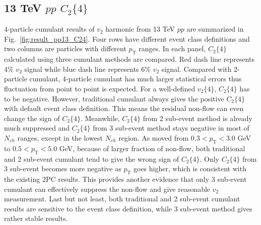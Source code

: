 \subsection{13 TeV $pp$ $C_{2}\{4\}$}
4-particle cumulant results of $v_{2}$ harmonic from 13 TeV $pp$ are summarized in Fig.~\ref{fig:result_pp13_C24}. Four rows have different event class definitions and two columns are particles with different $p_{\text{T}}$ ranges. In each panel, $C_{2}\{4\}$ calculated using three cumulant methods are compared. Red dash line represents $4\%$ $v_{2}$ signal while blue dash line represents $6\%$ $v_{2}$ signal. Compared with 2-particle cumulant, 4-particle cumulant has much larger statistical errors thus fluctuation from point to point is expected. For a well-defined $v_{2}\{4\}$, $C_{2}\{4\}$ has to be negative. However, traditional cumulant always gives the positive $C_{2}\{4\}$ with default event class definition. This means the residual non-flow can even change the sign of $C_{2}\{4\}$. Meanwhile, $C_{2}\{4\}$ from 2 sub-event method is already much suppressed and $C_{2}\{4\}$ from 3 sub-event method stays negative in most of $N_{ch}$ ranges, except in the lowest $N_{ch}$ region. As moved from $0.3<p_{\text{T}}<3.0$ GeV to $0.5<p_{\text{T}}<5.0$ GeV, because of larger fraction of non-flow, both traditional and 2 sub-event cumulant tend to give the wrong sign of $C_{2}\{4\}$. Only $C_{2}\{4\}$ from 3 sub-event becomes more negative as $p_{\text{T}}$ goes higher, which is consistent with the existing 2PC results. This provides another evidence that only 3 sub-event cumulant can effectively suppress the non-flow and give reasonable $v_{2}$ measurement. Last but not least, both traditional and 2 sub-event cumulant results are sensitive to the event class definition, while 3 sub-event method gives rather stable results.
